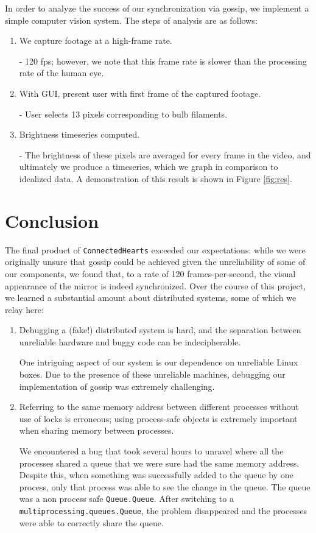 \documentclass[preprint,review,12pt]{cs262}
\begin{document}
In order to analyze the success of our synchronization via gossip, we implement a simple computer vision system. The steps of analysis are as follows: 

\begin{enumerate} 
\item We capture footage at a high-frame rate. 

- 120 fps; however, we note that this frame rate is slower than the processing rate of the human eye. 

\item With GUI, present user with first frame of the captured footage. 

- User selects 13 pixels corresponding to bulb filaments. 

\item Brightness timeseries computed. 

- The brightness of these pixels are averaged for every frame in the video, and ultimately we produce a timeseries, which we graph in comparison to idealized data. A demonstration of this result is shown in Figure \ref{fig:res}. 
\end{enumerate}


\section{Conclusion}

The final product of \texttt{ConnectedHearts} exceeded our expectations: while we were originally unsure that gossip could be achieved given the unreliability of some of our components, we found that, to a rate of 120 frames-per-second, the visual appearance of the mirror is indeed synchronized. Over the course of this project, we learned a substantial amount about distributed systems, some of which we relay here: 

\begin{enumerate}
\item Debugging a (fake!) distributed system is hard, and the separation between unreliable hardware and buggy code can be indecipherable. 

One intriguing aspect of our system is our dependence on unreliable Linux boxes. Due to the presence of these unreliable machines, debugging our implementation of gossip was extremely challenging. 

\item Referring to the same memory address between different processes without use of locks is erroneous; using process-safe objects is extremely important when sharing memory between processes.

We encountered a bug that took several hours to unravel where all the processes shared a queue that we were sure had the same memory address. Despite this, when something was successfully added to the queue by one process, only that process was able to see the change in the queue. The queue was a non process safe \texttt{Queue.Queue}. After switching to a \texttt{multiprocessing.queues.Queue}, the problem disappeared and the processes were able to correctly share the queue.
\end{enumerate}
\end{document}
